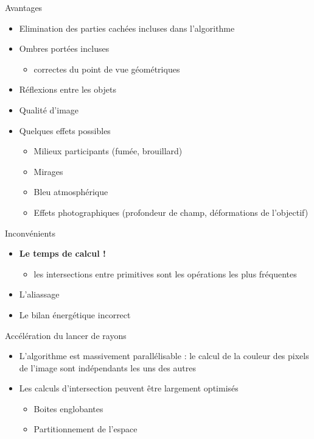 \begin{frame}{Avantages}
    \begin{itemize}
        \item Elimination des parties cachées incluses dans l'algorithme 
        \item Ombres portées incluses 
        \begin{itemize}
            \item correctes du point de vue géométriques 
        \end{itemize}
        \item Réflexions entre les objets 
        \item Qualité d'image 
        \item Quelques effets possibles 
        \begin{itemize}
            \item Milieux participants (fumée, brouillard)
            \item Mirages 
            \item Bleu atmosphérique 
            \item Effets photographiques (profondeur de champ, déformations de l'objectif)
        \end{itemize}
    \end{itemize}
    
\end{frame}

\begin{frame}{Inconvénients}
    \begin{itemize}
        \item \textbf{Le temps de calcul !}
        \begin{itemize}
            \item les intersections entre primitives sont les opérations les plus fréquentes
        \end{itemize}
        \item L'aliassage 
        \item Le bilan énergétique incorrect 
    \end{itemize}
\end{frame}

\begin{frame}{Accélération du lancer de rayons}
    \begin{itemize}
        \item L'algorithme est massivement parallélisable : le calcul de la couleur des  pixels de l'image sont indépendants les uns des autres 
        \item Les calculs d'intersection peuvent être largement optimisés 
        \begin{itemize}
            \item Boites englobantes 
            \item Partitionnement de l'espace 
        \end{itemize}
    \end{itemize}
\end{frame}

